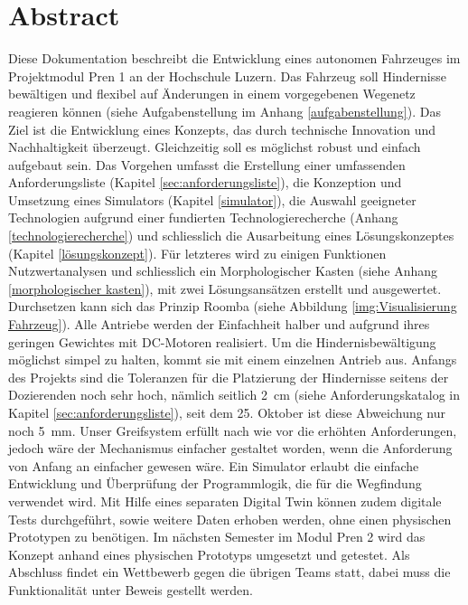 \newpage
\section{Abstract}

Diese Dokumentation beschreibt die Entwicklung eines autonomen Fahrzeuges im Projektmodul Pren 1 an der Hochschule Luzern. Das Fahrzeug soll Hindernisse bewältigen und flexibel auf Änderungen in einem vorgegebenen Wegenetz reagieren können (siehe Aufgabenstellung im Anhang \ref{aufgabenstellung}). Das Ziel ist die Entwicklung eines Konzepts, das durch technische Innovation und Nachhaltigkeit überzeugt. Gleichzeitig soll es möglichst robust und einfach aufgebaut sein.
Das Vorgehen umfasst die Erstellung einer umfassenden Anforderungsliste (Kapitel \ref{sec:anforderungsliste}), die Konzeption und Umsetzung eines Simulators (Kapitel \ref{simulator}), die Auswahl geeigneter Technologien aufgrund einer fundierten Technologierecherche (Anhang \ref{technologierecherche}) und schliesslich die Ausarbeitung eines Lösungskonzeptes (Kapitel \ref{lösungskonzept}). Für letzteres wird zu einigen Funktionen Nutzwertanalysen und schliesslich ein Morphologischer Kasten (siehe Anhang \ref{morphologischer kasten}), mit zwei Lösungsansätzen erstellt und ausgewertet. Durchsetzen kann sich das Prinzip Roomba (siehe Abbildung \ref{img:Visualisierung Fahrzeug}). Alle Antriebe werden der Einfachheit halber und aufgrund ihres geringen Gewichtes mit DC-Motoren realisiert. Um die Hindernisbewältigung möglichst simpel zu halten, kommt sie mit einem einzelnen Antrieb aus. Anfangs des Projekts sind die Toleranzen für die Platzierung der Hindernisse seitens der Dozierenden noch sehr hoch, nämlich seitlich 2 cm (siehe Anforderungskatalog in Kapitel \ref{sec:anforderungsliste}), seit dem 25. Oktober ist diese Abweichung nur noch 5 mm. Unser Greifsystem erfüllt nach wie vor die erhöhten Anforderungen, jedoch wäre der Mechanismus einfacher gestaltet worden, wenn die Anforderung von Anfang an einfacher gewesen wäre.
Ein Simulator erlaubt die einfache Entwicklung und Überprüfung der Programmlogik, die für die Wegfindung verwendet wird. Mit Hilfe eines separaten Digital Twin können zudem digitale Tests durchgeführt, sowie weitere Daten erhoben werden, ohne einen physischen Prototypen zu benötigen. 
Im nächsten Semester im Modul Pren 2 wird das Konzept anhand eines physischen Prototyps umgesetzt und getestet. Als Abschluss findet ein Wettbewerb gegen die übrigen Teams statt, dabei muss die Funktionalität unter Beweis gestellt werden.

